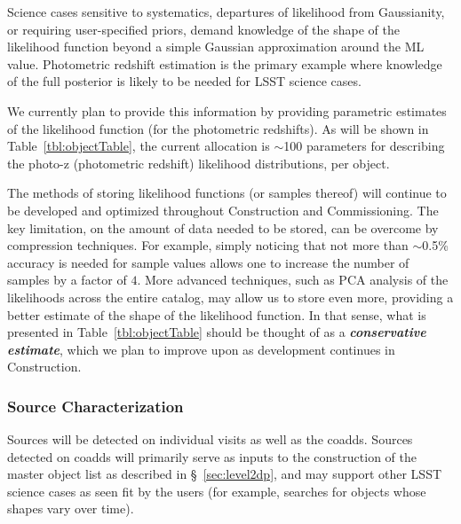 Science cases sensitive to systematics, departures of likelihood from Gaussianity, or requiring user-specified priors, demand knowledge of the shape of the likelihood function beyond a simple Gaussian approximation around the ML value.  Photometric redshift estimation is the primary example where knowledge of the full posterior is likely to be needed for LSST science cases.

We currently plan to provide this information by providing parametric estimates of the likelihood function (for the photometric redshifts). As will be shown in Table~\ref{tbl:objectTable}, the current allocation is $\sim$100 parameters for describing the photo-z (photometric redshift) likelihood distributions, per object.

The methods of storing likelihood functions (or samples thereof) will continue to be developed and optimized throughout Construction and Commissioning. The key limitation, on the amount of data needed to be stored, can be overcome by compression techniques. For example, simply noticing that not more than $\sim$0.5\% accuracy is needed for sample values allows one to increase the number of samples by a factor of $4$. More advanced techniques, such as PCA analysis of the likelihoods across the entire catalog, may allow us to store even more, providing a better estimate of the shape of the likelihood function. In that sense, what is presented in Table~\ref{tbl:objectTable} should be thought of as a \textbf{\emph{conservative estimate}}, which we plan to improve upon as development continues in Construction.

\subsubsection{Source Characterization}
\label{sec:sourceMeas}

Sources will be detected on individual visits as well as the coadds. Sources detected on coadds will primarily serve as inputs to the construction of the master object list as described in \S~\ref{sec:level2dp}, and may support other LSST science cases as seen fit by the users (for example, searches for objects whose shapes vary over time). 

